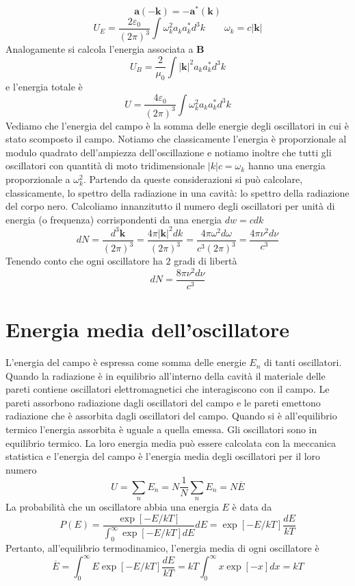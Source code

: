 $$
\mathbf{a}(-\mathbf{k}) = -\mathbf{a}^*(\mathbf{k})
$$
$$
U_E = \frac{2\varepsilon_0}{(2\pi)^3} \int \omega_k^2 a_k a_k^* d^3k \qquad \omega_k = c|\mathbf{k}|
$$
Analogamente si calcola l'energia associata a $\mathbf{B}$ 
$$
U_B = \frac{2}{\mu_0} \int |\mathbf{k}|^2 a_k a_k^* d^3k
$$
e l'energia totale è
$$
U = \frac{4\varepsilon_0}{(2\pi)^3} \int \omega_k^2 a_k a_k^* d^3k
$$
Vediamo che l'energia del campo è la somma delle energie degli oscillatori in cui è stato scomposto il campo. Notiamo che classicamente l'energia è proporzionale al modulo quadrato dell'ampiezza dell'oscillazione e notiamo inoltre che tutti gli oscillatori con quantità di moto tridimensionale $|k|c=\omega_k$ hanno una energia proporzionale a $\omega^2_k$. Partendo da queste considerazioni si può calcolare, classicamente, lo spettro della radiazione in una cavità: lo spettro della radiazione del corpo nero. Calcoliamo innanzitutto il numero degli oscillatori per unità di energia (o frequenza) corrispondenti da una energia $dw=cdk$
$$
dN = \frac{d^3\mathbf{k}}{(2\pi)^3} = \frac{4\pi |\mathbf{k}|^2 dk}{(2\pi)^3} = \frac{4\pi \omega^2 d\omega}{c^3 (2\pi)^3} = \frac{4\pi \nu^2 d\nu}{c^3}
$$
Tenendo conto che ogni oscillatore ha $2$ gradi di libertà 
$$
dN = \frac{8\pi \nu^2 d\nu}{c^3}
$$
\section{Energia media dell'oscillatore}
L'energia del campo è espressa come somma delle energie $E_n$ di tanti oscillatori. Quando la radiazione è in equilibrio all'interno della cavità il materiale delle pareti contiene oscillatori elettromagnetici che interagiscono con il campo. Le pareti assorbono radiazione dagli oscillatori del campo e le pareti emettono radiazione che è assorbita dagli oscillatori del campo. Quando si è all'equilibrio termico l'energia assorbita è uguale a quella emessa. Gli oscillatori sono in equilibrio termico. La loro energia media può essere calcolata con la meccanica statistica e l'energia del campo è l'energia media degli oscillatori per il loro numero
$$
U = \sum_n E_n = N \frac{1}{N} \sum_n E_n = N \overline{E}
$$
La probabilità che un oscillatore abbia una energia $E$ è data da
$$
P(E) = \frac{\exp[-E/kT]}{\int_0^\infty \exp[-E/kT] dE} dE = \exp[-E/kT] \frac{dE}{kT}
$$
Pertanto, all'equilibrio termodinamico, l'energia media di ogni oscillatore è
$$
\overline{E} = \int_0^\infty E \exp[-E/kT] \frac{dE}{kT} = kT \int_0^\infty x \exp[-x] dx = kT
$$
